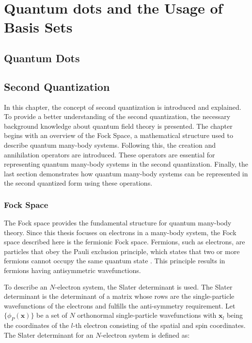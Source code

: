 \chapter{Quantum dots and the Usage of Basis Sets}
\label{c:background}

\section{Quantum Dots}

\section{Second Quantization}

In this chapter, the concept of second quantization is introduced and explained. To provide a better understanding of the second quantization, the necessary background knowledge about quantum field theory is presented.
The chapter begins with an overview of the Fock Space, a mathematical structure used to describe quantum many-body systems. Following this, the creation and annihilation operators are introduced. These operators are essential for representing quantum many-body systems in the second quantization. Finally, the last section demonstrates how quantum many-body systems can be represented in the second quantized form using these operations.

\subsection{Fock Space}
The Fock space provides the fundamental structure for quantum many-body theory. Since this thesis focuses on electrons in a many-body system, the Fock space described here is the fermionic Fock space. Fermions, such as electrons, are particles that obey the Pauli exclusion principle, which states that two or more fermions cannot occupy the same quantum state \cite{Griffiths2014}. This principle results in fermions having antisymmetric wavefunctions.

To describe an $N$-electron system, the Slater determinant is used. The Slater determinant is the determinant of a matrix whose rows are the single-particle wavefunctions of the electrons and fulfills the anti-symmetry requirement. 
Let $\{\phi_P(\textbf{x})\}$ be a set of $N$ orthonormal single-particle wavefunctions with $\textbf{x}_l$ being the coordinates of the $l$-th electron consisting of the spatial and spin coordinates.
The Slater determinant for an $N$-electron system is defined as: 

